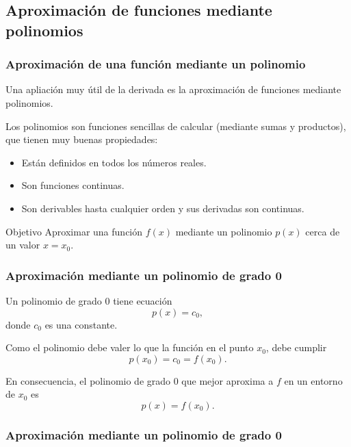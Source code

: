\subsection{Aproximación de funciones mediante polinomios}

\begin{frame}
	\frametitle{Aproximación de una función mediante un polinomio}
	Una apliación muy útil de la derivada es la aproximación de funciones mediante polinomios.
	
	Los polinomios son funciones sencillas de calcular (mediante sumas y productos), que tienen muy buenas propiedades:
	\begin{itemize}
		\item Están definidos en todos los números reales.
		\item Son funciones continuas.
		\item Son derivables hasta cualquier orden y sus derivadas son continuas.
	\end{itemize}
	
	\begin{block}{Objetivo}
		Aproximar una función $f(x)$ mediante un polinomio $p(x)$ cerca de un valor $x=x_0$.
	\end{block}
	
\end{frame}


\begin{frame}
	\frametitle{Aproximación mediante un polinomio de grado 0}
	Un polinomio de grado 0 tiene ecuación
	\[
		p(x) = c_0,
	\]
	donde $c_0$ es una constante.
	
	Como el polinomio debe valer lo que la función en el punto $x_0$, debe cumplir
	\[p(x_0) = c_0 = f(x_0).\]
	
	En consecuencia, el polinomio de grado 0 que mejor aproxima a $f$ en un entorno de $x_0$ es
	\[p(x) = f(x_0).\]
\end{frame}


\begin{frame}
	\frametitle{Aproximación mediante un polinomio de grado 0}
	\begin{center}
		\scalebox{1}{}
	\end{center}
\end{frame}


